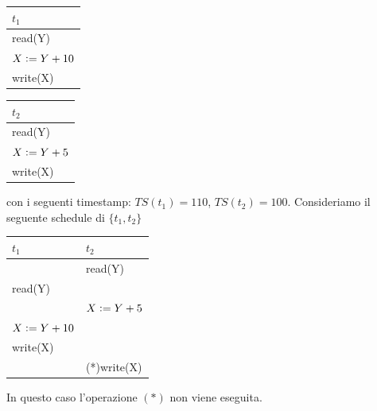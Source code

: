 \begin{multicols}{2}
 \begin{tabular}{|l|}
  \hline
  $t_1$\\
  \hline
  read(Y)\\
  $X\vcentcolon=Y+10$\\
  write(X)\\
  \hline
 \end{tabular}

  \begin{tabular}{|l|}
  \hline
  $t_2$\\
  \hline
  read(Y)\\
  $X\vcentcolon=Y+5$\\
  write(X)\\
  \hline
 \end{tabular} 
\end{multicols}
con i seguenti timestamp: $TS(t_1)= 110$, $TS(t_2)=100$. Consideriamo il seguente schedule di $\{t_1, t_2\}$
\begin{center}
 \begin{tabular}{|l|l|}
 \hline
  $t_1$ & $t_2$\\
 \hline
 &read(Y)\\
 read(Y)&\\
 &$X\vcentcolon=Y+5$\\
 $X\vcentcolon =Y+10$&\\
  write(X)&\\
  &(*)write(X)\\
  \hline
 \end{tabular}
\end{center}

In questo caso l’operazione $(*)$ non viene eseguita.
